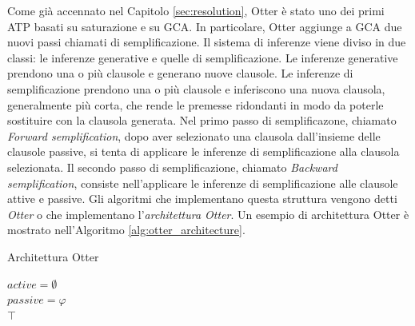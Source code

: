 \documentclass[./main.tex]{subfiles}
\begin{document}
Come già accennato nel Capitolo \ref{sec:resolution}, Otter è stato uno dei primi ATP basati su saturazione e su GCA.
In particolare, Otter aggiunge a GCA due nuovi passi chiamati di semplificazione.
Il sistema di inferenze viene diviso in due classi: le inferenze generative e quelle di semplificazione.
Le inferenze generative prendono una o più clausole e generano nuove clausole.
Le inferenze di semplificazione prendono una o più clausole e inferiscono 
una nuova clausola, generalmente più corta, che rende le premesse ridondanti in modo da poterle sostituire
con la clausola generata. 
Nel primo passo di semplificazone, chiamato \textit{Forward semplification}, dopo aver selezionato una 
clausola dall'insieme delle clausole passive, si tenta di applicare le inferenze di semplificazione
alla clausola selezionata. Il secondo passo di semplificazione, chiamato \textit{Backward semplification},
consiste nell'applicare le inferenze di semplificazione alle clausole attive e passive.
Gli algoritmi che implementano questa struttura vengono detti \textit{Otter} o che
implementano l'\textit{architettura Otter}. Un esempio di architettura Otter è mostrato nell'Algoritmo \ref{alg:otter_architecture}.

\begin{algorithm}[H]
    \caption{Architettura Otter} \label{alg:otter_architecture}


    $active = \emptyset$ \\
    $passive = \varphi$ \\

    \Return $\top$\;    
\end{algorithm}
\end{document}
